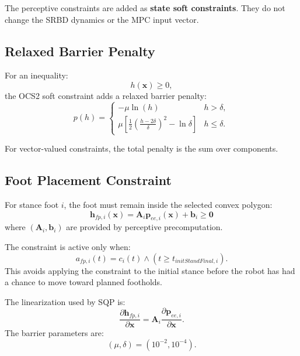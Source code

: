 \documentclass[11pt,a4paper]{article}
\begin{document}
The perceptive constraints are added as \textbf{state soft constraints}. They do not change the SRBD dynamics or the MPC input vector.

\subsection{Relaxed Barrier Penalty}

For an inequality:
\begin{equation}
	h(\bm{x})\geq 0,
\end{equation}
the OCS2 soft constraint adds a relaxed barrier penalty:
\begin{equation}
	p(h)
	=
	\begin{cases}
		-\mu\ln(h) & h>\delta,\\[4pt]
		\mu\left[
			\frac{1}{2}
			\left(
				\frac{h-2\delta}{\delta}
			\right)^2
			-
			\ln\delta
		\right] & h\leq\delta.
	\end{cases}
\end{equation}

For vector-valued constraints, the total penalty is the sum over components.

\subsection{Foot Placement Constraint}

For stance foot $i$, the foot must remain inside the selected convex polygon:
\begin{equation}
	\boxed{
		\bm{h}_{fp,i}(\bm{x})
		=
		\bm{A}_i
		\bm{p}_{ee,i}(\bm{x})
		+
		\bm{b}_i
		\geq
		\bm{0}
	}
\end{equation}
where $(\bm{A}_i,\bm{b}_i)$ are provided by perceptive precomputation.

The constraint is active only when:
\begin{equation}
	a_{fp,i}(t)
	=
	c_i(t)
	\land
	(t\geq t_{initStandFinal,i}).
\end{equation}
This avoids applying the constraint to the initial stance before the robot has had a chance to move toward planned footholds.

The linearization used by SQP is:
\begin{equation}
	\frac{\partial \bm{h}_{fp,i}}{\partial \bm{x}}
	=
	\bm{A}_i
	\frac{\partial \bm{p}_{ee,i}}{\partial \bm{x}}.
\end{equation}
The barrier parameters are:
\begin{equation}
	(\mu,\delta)=(10^{-2},10^{-4}).
\end{equation}
\end{document}
